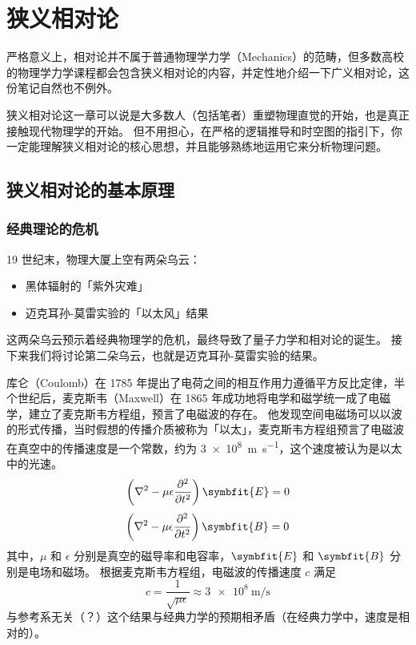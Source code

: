 \chapter{狭义相对论}\label{chap:special-relativity}

\begin{intro}
    严格意义上，相对论并不属于普通物理学力学（Mechanics）的范畴，但多数高校的物理学力学课程都会包含狭义相对论的内容，并定性地介绍一下广义相对论，这份笔记自然也不例外。

    狭义相对论这一章可以说是大多数人（包括笔者）重塑物理直觉的开始，也是真正接触现代物理学的开始。
    但不用担心，在严格的逻辑推导和时空图的指引下，你一定能理解狭义相对论的核心思想，并且能够熟练地运用它来分析物理问题。
\end{intro}

\section{狭义相对论的基本原理}

\subsection{经典理论的危机}

19 世纪末，物理大厦上空有两朵乌云：
\begin{itemize}
    \item 黑体辐射的「紫外灾难」
    \item 迈克耳孙-莫雷实验的「以太风」结果
\end{itemize}
这两朵乌云预示着经典物理学的危机，最终导致了量子力学和相对论的诞生。
接下来我们将讨论第二朵乌云，也就是迈克耳孙-莫雷实验的结果。

库仑（Coulomb）在 1785 年提出了电荷之间的相互作用力遵循平方反比定律，半个世纪后，麦克斯韦（Maxwell）在 1865 年成功地将电学和磁学统一成了电磁学，建立了麦克斯韦方程组，预言了电磁波的存在。
他发现空间电磁场可以以波的形式传播，当时假想的传播介质被称为「以太」，麦克斯韦方程组预言了电磁波在真空中的传播速度是一个常数，约为 \qty{3e8}{\metre\per\second}，这个速度被认为是以太中的光速。
\begin{equation}
    \left(\nabla^2 - \mu \epsilon \frac{\partial^2}{\partial t^2}\right) \symbfit{E} = 0
\end{equation}
\begin{equation}
    \left(\nabla^2 - \mu \epsilon \frac{\partial^2}{\partial t^2}\right) \symbfit{B} = 0
\end{equation}
其中，$ \mu $ 和 $ \epsilon $ 分别是真空的磁导率和电容率，$ \symbfit{E} $ 和 $ \symbfit{B} $ 分别是电场和磁场。
根据麦克斯韦方程组，电磁波的传播速度 $ c $ 满足
\begin{equation}
    c = \frac{1}{\sqrt{\mu \epsilon}} \approx \qty{3e8}{\metre\per\second}
\end{equation}
与参考系无关（？）这个结果与经典力学的预期相矛盾（在经典力学中，速度是相对的）。

